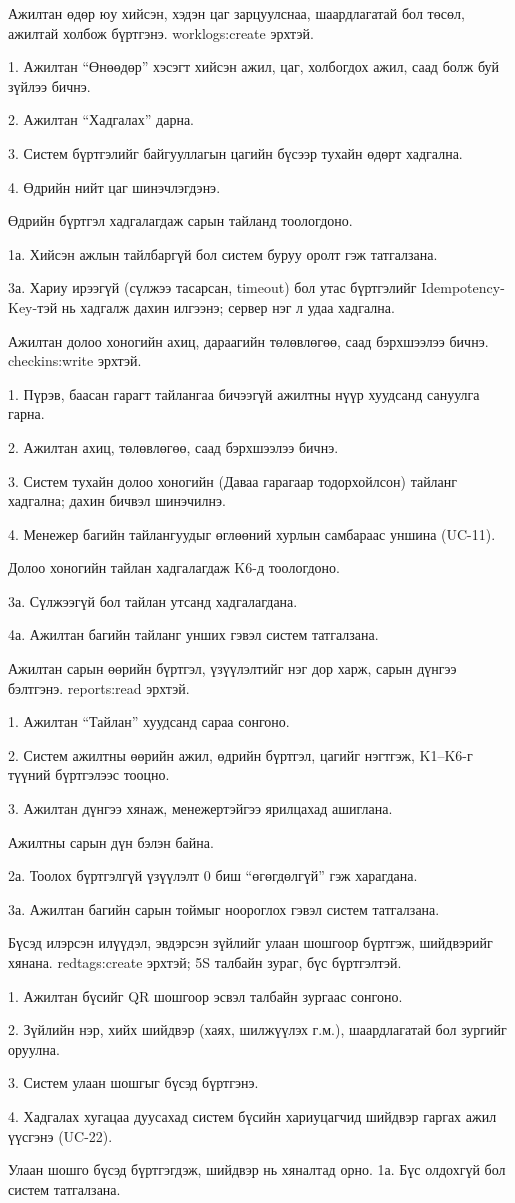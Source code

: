 {Ажилтан өдөр юу хийсэн, хэдэн цаг зарцуулснаа, шаардлагатай бол төсөл, ажилтай холбож бүртгэнэ.}
{worklogs:create эрхтэй.}
{1. Ажилтан ``Өнөөдөр'' хэсэгт хийсэн ажил, цаг, холбогдох ажил, саад болж буй зүйлээ бичнэ.\par
 2. Ажилтан ``Хадгалах'' дарна.\par
 3. Систем бүртгэлийг байгууллагын цагийн бүсээр тухайн өдөрт хадгална.\par
 4. Өдрийн нийт цаг шинэчлэгдэнэ.}
{Өдрийн бүртгэл хадгалагдаж сарын тайланд тоологдоно.}
{1а. Хийсэн ажлын тайлбаргүй бол систем буруу оролт гэж татгалзана.\par
 3а. Хариу ирээгүй (сүлжээ тасарсан, timeout) бол утас бүртгэлийг Idempotency-Key-тэй нь хадгалж дахин илгээнэ; сервер нэг л удаа хадгална.}

{Ажилтан долоо хоногийн ахиц, дараагийн төлөвлөгөө, саад бэрхшээлээ бичнэ.}
{checkins:write эрхтэй.}
{1. Пүрэв, баасан гарагт тайлангаа бичээгүй ажилтны нүүр хуудсанд сануулга гарна.\par
 2. Ажилтан ахиц, төлөвлөгөө, саад бэрхшээлээ бичнэ.\par
 3. Систем тухайн долоо хоногийн (Даваа гарагаар тодорхойлсон) тайланг хадгална; дахин бичвэл шинэчилнэ.\par
 4. Менежер багийн тайлангуудыг өглөөний хурлын самбараас уншина (UC-11).}
{Долоо хоногийн тайлан хадгалагдаж K6-д тоологдоно.}
{3а. Сүлжээгүй бол тайлан утсанд хадгалагдана.\par
 4а. Ажилтан багийн тайланг унших гэвэл систем татгалзана.}

{Ажилтан сарын өөрийн бүртгэл, үзүүлэлтийг нэг дор харж, сарын дүнгээ бэлтгэнэ.}
{reports:read эрхтэй.}
{1. Ажилтан ``Тайлан'' хуудсанд сараа сонгоно.\par
 2. Систем ажилтны өөрийн ажил, өдрийн бүртгэл, цагийг нэгтгэж, K1--K6-г түүний бүртгэлээс тооцно.\par
 3. Ажилтан дүнгээ хянаж, менежертэйгээ ярилцахад ашиглана.}
{Ажилтны сарын дүн бэлэн байна.}
{2а. Тоолох бүртгэлгүй үзүүлэлт 0 биш ``өгөгдөлгүй'' гэж харагдана.\par
 3а. Ажилтан багийн сарын тоймыг ноороглох гэвэл систем татгалзана.}

{Бүсэд илэрсэн илүүдэл, эвдэрсэн зүйлийг улаан шошгоор бүртгэж, шийдвэрийг хянана.}
{redtags:create эрхтэй; 5S талбайн зураг, бүс бүртгэлтэй.}
{1. Ажилтан бүсийг QR шошгоор эсвэл талбайн зургаас сонгоно.\par
 2. Зүйлийн нэр, хийх шийдвэр (хаях, шилжүүлэх г.м.), шаардлагатай бол зургийг оруулна.\par
 3. Систем улаан шошгыг бүсэд бүртгэнэ.\par
 4. Хадгалах хугацаа дуусахад систем бүсийн хариуцагчид шийдвэр гаргах ажил үүсгэнэ (UC-22).}
{Улаан шошго бүсэд бүртгэгдэж, шийдвэр нь хяналтад орно.}
{1а. Бүс олдохгүй бол систем татгалзана.}

